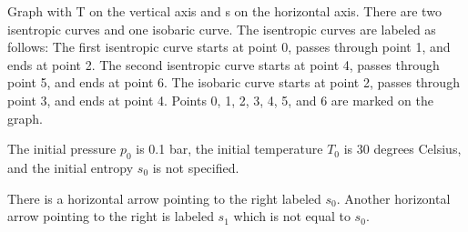 Graph with T on the vertical axis and s on the horizontal axis. There are two isentropic curves and one isobaric curve. The isentropic curves are labeled as follows: The first isentropic curve starts at point 0, passes through point 1, and ends at point 2. The second isentropic curve starts at point 4, passes through point 5, and ends at point 6. The isobaric curve starts at point 2, passes through point 3, and ends at point 4. Points 0, 1, 2, 3, 4, 5, and 6 are marked on the graph.

The initial pressure \( p_0 \) is 0.1 bar, the initial temperature \( T_0 \) is 30 degrees Celsius, and the initial entropy \( s_0 \) is not specified.

There is a horizontal arrow pointing to the right labeled \( s_0 \). Another horizontal arrow pointing to the right is labeled \( s_1 \) which is not equal to \( s_0 \).